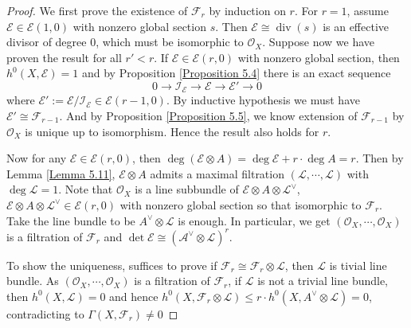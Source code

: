 \documentclass{ctexart}
\newcommand{\divisor}{\operatorname{div}}
\begin{document}
\begin{proof}
    We first prove the existence of $\mathcal{F}_{r}$ by induction on $r$.
    For $r = 1$, assume $\mathcal{E}\in \mathcal{E}(1, 0)$ with nonzero global section $s$.
    Then $\mathcal{E} \cong \divisor (s)$ is an effective divisor of degree $0$, which must be isomorphic to $\mathcal{O}_{X}$.
    Suppose now we have proven the result for all $r' < r$.
    If $\mathcal{E}\in \mathcal{E}(r, 0)$ with nonzero global section, then $h^{0}(X, \mathcal{E}) = 1$ and by Proposition \ref{Proposition 5.4} there is an exact sequence
    \begin{equation}
        0 \longrightarrow \mathcal{I}_{\mathcal{E}} \longrightarrow \mathcal{E} \longrightarrow \mathcal{E}' \longrightarrow 0
    \end{equation}
    where $\mathcal{E}' := \mathcal{E}/\mathcal{I}_{\mathcal{E}}\in \mathcal{E}(r - 1, 0)$.
    By inductive hypothesis we must have $\mathcal{E}' \cong \mathcal{F}_{r - 1}$.
    And by Proposition \ref{Proposition 5.5}, we know extension of $\mathcal{F}_{r - 1}$ by $\mathcal{O}_{X}$ is unique up to isomorphism.
    Hence the result also holds for $r$.
    \par
    Now for any $\mathcal{E}\in \mathcal{E}(r, 0)$, then $\deg (\mathcal{E} \otimes A) = \deg \mathcal{E} + r \cdot \deg A = r$.
    Then by Lemma \ref{Lemma 5.11}, $\mathcal{E} \otimes A$ admits a maximal filtration $(\mathcal{L}, \cdots, \mathcal{L})$ with $\deg \mathcal{L} = 1$.
    Note that $\mathcal{O}_{X}$ is a line subbundle of $\mathcal{E} \otimes A \otimes \mathcal{L}^{\vee}$,
    $\mathcal{E} \otimes A \otimes \mathcal{L}^{\vee}\in \mathcal{E}(r, 0)$ with nonzero global section so that isomorphic to $\mathcal{F}_{r}$.
    Take the line bundle to be $A^{\vee} \otimes \mathcal{L}$ is enough.
    In particular, we get $(\mathcal{O}_{X}, \cdots, \mathcal{O}_{X})$ is a filtration of $\mathcal{F}_{r}$ and $\det \mathcal{E} \cong (\mathcal{A}^{\vee} \otimes \mathcal{L})^{r}$.
    \par
    To show the uniqueness, suffices to prove if $\mathcal{F}_{r} \cong \mathcal{F}_{r} \otimes \mathcal{L}$, then $\mathcal{L}$ is tivial line bundle.
    As $(\mathcal{O}_{X}, \cdots, \mathcal{O}_{X})$ is a filtration of $\mathcal{F}_{r}$,
    if $\mathcal{L}$ is not a trivial line bundle, then $h^{0}(X, \mathcal{L}) = 0$ and hence $h^{0}(X, \mathcal{F}_{r} \otimes \mathcal{L}) \le r \cdot h^{0}(X, A^{\vee} \otimes \mathcal{L}) = 0$, contradicting to $\Gamma(X, \mathcal{F}_{r}) \neq 0$
\end{proof}
\end{document}
